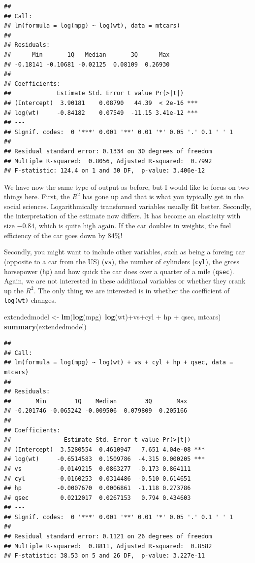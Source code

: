 \documentclass[]{article}
\newenvironment{Shaded}{\begin{snugshade}}{\end{snugshade}}
\newcommand{\KeywordTok}[1]{\textcolor[rgb]{0.13,0.29,0.53}{\textbf{{#1}}}}
\newcommand{\StringTok}[1]{\textcolor[rgb]{0.31,0.60,0.02}{{#1}}}
\newcommand{\NormalTok}[1]{{#1}}
\theoremstyle{definition}
\theoremstyle{definition}
\theoremstyle{definition}
\theoremstyle{remark}
\begin{document}
\begin{verbatim}
## 
## Call:
## lm(formula = log(mpg) ~ log(wt), data = mtcars)
## 
## Residuals:
##      Min       1Q   Median       3Q      Max 
## -0.18141 -0.10681 -0.02125  0.08109  0.26930 
## 
## Coefficients:
##             Estimate Std. Error t value Pr(>|t|)    
## (Intercept)  3.90181    0.08790   44.39  < 2e-16 ***
## log(wt)     -0.84182    0.07549  -11.15 3.41e-12 ***
## ---
## Signif. codes:  0 '***' 0.001 '**' 0.01 '*' 0.05 '.' 0.1 ' ' 1
## 
## Residual standard error: 0.1334 on 30 degrees of freedom
## Multiple R-squared:  0.8056, Adjusted R-squared:  0.7992 
## F-statistic: 124.4 on 1 and 30 DF,  p-value: 3.406e-12
\end{verbatim}

We have now the same type of output as before, but I would like to focus
on two things here. First, the \(R^2\) has gone up and that is what you
typically get in the social sciences. Logarithmically transformed
variables usually \textbf{fit} better. Secondly, the interpretation of
the estimate now differs. It has become an elasticity with size
\(-0.84\), which is quite high again. If the car doubles in weights, the
fuel efficiency of the car goes down by 84\%!

Secondly, you might want to include other variables, such as being a
foreing car (opposite to a car from the US) (\texttt{vs}), the number of
cylinders (\texttt{cyl}), the gross horsepower (\texttt{hp}) and how
quick the car does over a quarter of a mile (\texttt{qsec}). Again, we
are not interested in these additional variables or whether they crank
up the \(R^2\). The only thing we are interested is in whether the
coefficient of \texttt{log(wt)} changes.

\begin{Shaded}
\begin{Highlighting}[]
\NormalTok{extendedmodel <-}\StringTok{ }\KeywordTok{lm}\NormalTok{(}\KeywordTok{log}\NormalTok{(mpg)~}\KeywordTok{log}\NormalTok{(wt)+vs+cyl +}\StringTok{ }\NormalTok{hp +}\StringTok{ }\NormalTok{qsec, mtcars)}
\KeywordTok{summary}\NormalTok{(extendedmodel)}
\end{Highlighting}
\end{Shaded}

\begin{verbatim}
## 
## Call:
## lm(formula = log(mpg) ~ log(wt) + vs + cyl + hp + qsec, data = mtcars)
## 
## Residuals:
##       Min        1Q    Median        3Q       Max 
## -0.201746 -0.065242 -0.009506  0.079809  0.205166 
## 
## Coefficients:
##               Estimate Std. Error t value Pr(>|t|)    
## (Intercept)  3.5280554  0.4610947   7.651 4.04e-08 ***
## log(wt)     -0.6514583  0.1509786  -4.315 0.000205 ***
## vs          -0.0149215  0.0863277  -0.173 0.864111    
## cyl         -0.0160253  0.0314486  -0.510 0.614651    
## hp          -0.0007670  0.0006861  -1.118 0.273786    
## qsec         0.0212017  0.0267153   0.794 0.434603    
## ---
## Signif. codes:  0 '***' 0.001 '**' 0.01 '*' 0.05 '.' 0.1 ' ' 1
## 
## Residual standard error: 0.1121 on 26 degrees of freedom
## Multiple R-squared:  0.8811, Adjusted R-squared:  0.8582 
## F-statistic: 38.53 on 5 and 26 DF,  p-value: 3.227e-11
\end{verbatim}
\end{document}
